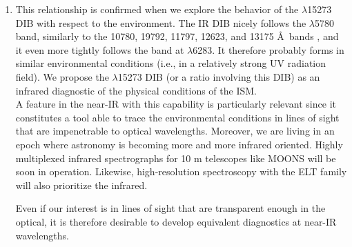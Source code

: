 \documentclass[printer]{aa} %
\begin{document}
\begin{enumerate}
\item This relationship is confirmed when we explore the behavior of the $\lambda$15273 DIB with respect to the environment. The IR DIB nicely follows the $\lambda$5780 band, similarly to the  10780, 19792, 11797, 12623, and 13175 \AA\ bands \citep{Hamano16}, and it even more tightly follows the band at $\lambda$6283. It therefore probably forms in similar environmental conditions (i.e., in a relatively strong UV radiation field). We propose the $\lambda$15273 DIB (or a ratio involving this DIB) as an infrared diagnostic of the physical conditions of the ISM.\\
A feature in the near-IR with this capability is particularly relevant since it constitutes a tool able to trace the environmental conditions in lines of sight that are impenetrable to optical wavelengths. Moreover, we are living in an epoch where astronomy is becoming more and more infrared oriented. Highly multiplexed infrared spectrographs for 10 m telescopes like MOONS \citep{Cirasuolo14} will be soon in operation. Likewise, high-resolution spectroscopy with the ELT family will also prioritize the infrared.

Even if our interest is in lines of sight that are transparent enough in the optical, it is therefore desirable to develop equivalent diagnostics at near-IR wavelengths.

\end{enumerate}
\end{document}
